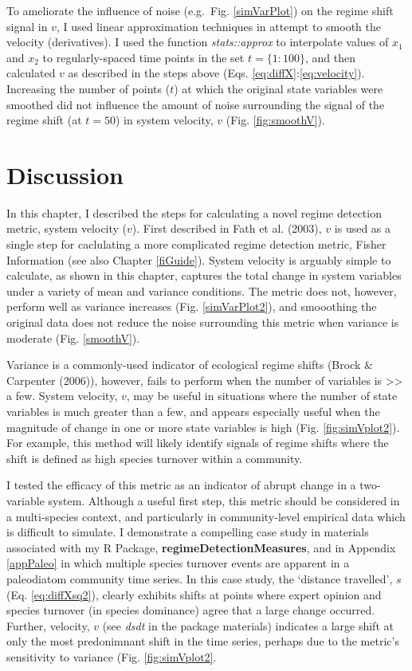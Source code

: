 \documentclass[12pt,twoside,openany]{reedthesis}
\begin{document}
To ameliorate the influence of noise (e.g.~Fig. \ref{simVarPlot}) on the
regime shift signal in \(v\), I used linear approximation techniques in
attempt to smooth the velocity (derivatives). I used the function
\emph{stats::approx} to interpolate values of \(x_1\) and \(x_2\) to
regularly-spaced time points in the set \(t=\{1:100\}\), and then
calculated \(v\) as described in the steps above (Eqs.
\eqref{eq:diffX}:\eqref{eq:velocity}). Increasing the number of points
(\(t\)) at which the original state variables were smoothed did not
influence the amount of noise surrounding the signal of the regime shift
(at \(t=50\)) in system velocity, \(v\) (Fig. \ref{fig:smoothV}).

\section{Discussion}\label{discussion-3}

In this chapter, I described the steps for calculating a novel regime
detection metric, system velocity (\(v\)). First described in Fath et
al. (2003), \(v\) is used as a single step for caclulating a more
complicated regime detection metric, Fisher Information (see also
Chapter \ref{fiGuide}). System velocity is arguably simple to calculate,
as shown in this chapter, captures the total change in system variables
under a variety of mean and variance conditions. The metric does not,
however, perform well as variance increases (Fig. \ref{simVarPlot2}),
and smooothing the original data does not reduce the noise surrounding
this metric when variance is moderate (Fig. \ref{smoothV}).

Variance is a commonly-used indicator of ecological regime shifts (Brock
\& Carpenter (2006)), however, fails to perform when the number of
variables is \textgreater{}\textgreater{} a few. System velocity, \(v\),
may be useful in situations where the number of state variables is much
greater than a few, and appears especially useful when the magnitude of
change in one or more state variables is high (Fig.
\ref{fig:simVplot2}). For example, this method will likely identify
signals of regime shifts where the shift is defined as high species
turnover within a community.

I tested the efficacy of this metric as an indicator of abrupt change in
a two-variable system. Although a useful first step, this metric should
be considered in a multi-species context, and particularly in
community-level empirical data which is difficult to simulate. I
demonstrate a compelling case study in materials associated with my R
Package, \textbf{regimeDetectionMeasures}, and in Appendix
\ref{appPaleo} in which multiple species turnover events are apparent in
a paleodiatom community time series. In this case study, the `distance
travelled', \(s\) (Eq. \eqref{eq:diffXsq2}), clearly exhibits shifts at
points where expert opinion and species turnover (in species dominance)
agree that a large change occurred. Further, velocity, \(v\) (see
\emph{dsdt} in the package materials) indicates a large shift at only
the most predonimnant shift in the time series, perhaps due to the
metric's sensitivity to variance (Fig. \ref{fig:simVplot2}.
\end{document}
